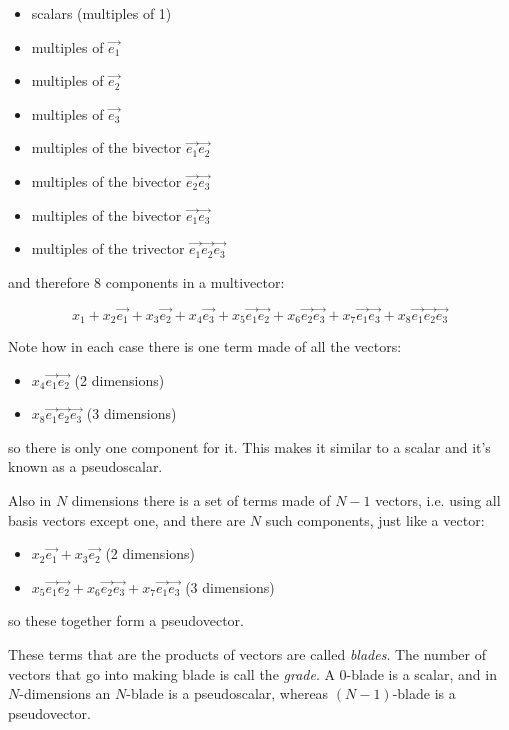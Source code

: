 \begin{itemize}    
    \item scalars (multiples of 1)
    \item multiples of $\vec{e_1}$
    \item multiples of $\vec{e_2}$
    \item multiples of $\vec{e_3}$
    \item multiples of the bivector $\vec{e_1}\vec{e_2}$
    \item multiples of the bivector $\vec{e_2}\vec{e_3}$
    \item multiples of the bivector $\vec{e_1}\vec{e_3}$
    \item multiples of the trivector $\vec{e_1}\vec{e_2}\vec{e_3}$
\end{itemize}

and therefore 8 components in a multivector:

$$
x_1 + x_2\vec{e_1} + x_3\vec{e_2} + x_4\vec{e_3}
+ x_5\vec{e_1}\vec{e_2}
+ x_6\vec{e_2}\vec{e_3}
+ x_7\vec{e_1}\vec{e_3}
+ x_8\vec{e_1}\vec{e_2}\vec{e_3}
$$

Note how in each case there is one term made of all the vectors:

\begin{itemize} 
    \item $x_4\vec{e_1}\vec{e_2}$ (2 dimensions)
    \item $x_8\vec{e_1}\vec{e_2}\vec{e_3}$ (3 dimensions)
\end{itemize}

so there is only one component for it. This makes it similar to a scalar and it's known as a pseudoscalar.

Also in $N$ dimensions there is a set of terms made of $N-1$ vectors, i.e. using all basis vectors except one, and there are $N$ such components, just like a vector:

\begin{itemize}
    \item $x_2\vec{e_1} + x_3\vec{e_2}$ (2 dimensions)
    \item $x_5\vec{e_1}\vec{e_2} + x_6\vec{e_2}\vec{e_3} + x_7\vec{e_1}\vec{e_3}$ (3 dimensions)
\end{itemize}

so these together form a pseudovector.

These terms that are the products of vectors are called \textit{blades}. The number of vectors that go into making blade is call the \textit{grade}. A 0-blade is a scalar, and in $N$-dimensions an $N$-blade is a pseudoscalar, whereas $(N-1)$-blade is a pseudovector.

